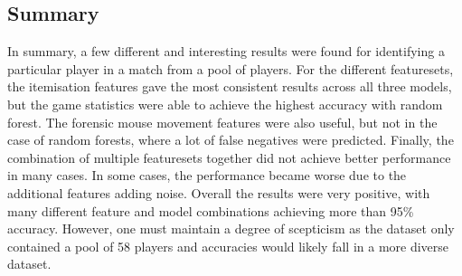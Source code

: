\documentclass[Report.tex]{subfiles}
\begin{document}


\subsection{Summary}
In summary, a few different and interesting results were found for identifying a particular player in a match from a pool of players. For the different featuresets, the itemisation features gave the most consistent results across all three models, but the game statistics were able to achieve the highest accuracy with random forest. The forensic mouse movement features were also useful, but not in the case of random forests, where a lot of false negatives were predicted. Finally, the combination of multiple featuresets together did not achieve better performance in many cases. In some cases, the performance became worse due to the additional features adding noise. Overall the results were very positive, with many different feature and model combinations achieving more than 95\% accuracy. However, one must maintain a degree of scepticism as the dataset only contained a pool of 58 players and accuracies would likely fall in a more diverse dataset. 
\end{document}
